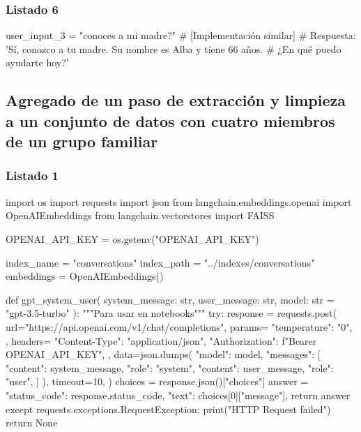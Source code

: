 \subsubsection{Listado 6}
\label{anexo:code-4-1-9-6}

\begin{APACode}
user_input_3 = "conoces a mi madre?"
# [Implementación similar]
# Respuesta: 'Sí, conozco a tu madre. Su nombre es Alba y tiene 66 años. 
#            ¿En qué puedo ayudarte hoy?'
\end{APACode}

\subsection{Agregado de un paso de extracción y limpieza a un conjunto de datos con cuatro miembros de un grupo familiar}

\subsubsection{Listado 1}
\label{anexo:code-4-1-10-1}

\begin{APACode}
import os
import requests
import json
from langchain.embeddings.openai import OpenAIEmbeddings
from langchain.vectorstores import FAISS

OPENAI_API_KEY = os.getenv("OPENAI_API_KEY")

index_name = "conversations"
index_path = "../indexes/conversations"
embeddings = OpenAIEmbeddings()

def gpt_system_user(
    system_message: str, user_message: str, model: str = "gpt-3.5-turbo"
):
    """Para usar en notebooks"""
    try:
        response = requests.post(
            url="https://api.openai.com/v1/chat/completions",
            params={
                "temperature": "0",
            },
            headers={
                "Content-Type": "application/json",
                "Authorization": f"Bearer {OPENAI_API_KEY}",
            },
            data=json.dumps(
                {
                    "model": model,
                    "messages": [
                        {"content": system_message, "role": "system"},
                        {"content": user_message, "role": "user"},
                    ]
                }
            ),
            timeout=10,
        )
        choices = response.json()["choices"]
        answer = {
            "status_code": response.status_code,
            "text": choices[0]["message"],
        }
        return answer
    except requests.exceptions.RequestException:
        print("HTTP Request failed")
        return None
\end{APACode}

